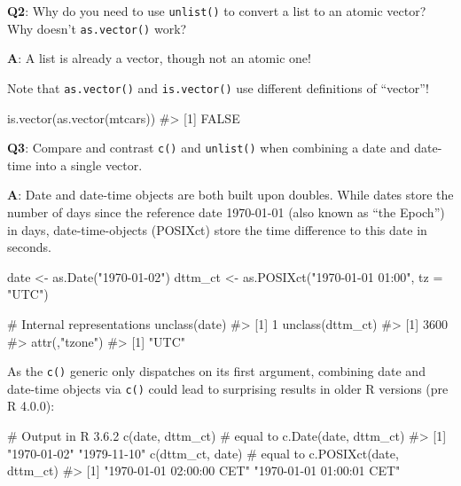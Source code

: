 \documentclass[
]{krantz}
\makeatletter
\newenvironment{Shaded}{\begin{snugshade}}{\end{snugshade}}
\newcommand{\CommentTok}[1]{\textcolor[rgb]{0.56,0.35,0.01}{\textit{#1}}}
\newcommand{\DataTypeTok}[1]{\textcolor[rgb]{0.13,0.29,0.53}{#1}}
\newcommand{\KeywordTok}[1]{\textcolor[rgb]{0.13,0.29,0.53}{\textbf{#1}}}
\newcommand{\NormalTok}[1]{#1}
\newcommand{\StringTok}[1]{\textcolor[rgb]{0.31,0.60,0.02}{#1}}
\newenvironment{kframe}{%
\medskip{}
\setlength{\fboxsep}{.8em}
 \def\at@end@of@kframe{}%
 \ifinner\ifhmode%
  \def\at@end@of@kframe{\end{minipage}}%
  \begin{minipage}{\columnwidth}%
 \fi\fi%
 \def\FrameCommand##1{\hskip\@totalleftmargin \hskip-\fboxsep
 \colorbox{shadecolor}{##1}\hskip-\fboxsep
     \hskip-\linewidth \hskip-\@totalleftmargin \hskip\columnwidth}%
 \MakeFramed {\advance\hsize-\width
   \@totalleftmargin\z@ \linewidth\hsize
   \@setminipage}}%
 {\par\unskip\endMakeFramed%
 \at@end@of@kframe}
\renewenvironment{Shaded}{\begin{kframe}}{\end{kframe}}
\renewcommand{\KeywordTok} [1]{\textcolor[rgb]{0.00,0.44,0.13}{{#1}}}
\renewcommand{\DataTypeTok}[1]{\textcolor[rgb]{0.56,0.13,0.00}{{#1}}}
\renewcommand{\StringTok}  [1]{\textcolor[rgb]{0.25,0.44,0.63}{{#1}}}
\renewcommand{\CommentTok} [1]{\textcolor[rgb]{0.38,0.63,0.69}{{#1}}}
\renewcommand{\NormalTok}  [1]{{#1}}
\makeatother
\begin{document}
\textbf{{Q2}}: Why do you need to use \texttt{unlist()} to convert a list to an atomic vector? Why doesn't \texttt{as.vector()} work?

\textbf{{A}}: A list is already a vector, though not an atomic one!

Note that \texttt{as.vector()} and \texttt{is.vector()} use different definitions of
``vector''!

\begin{Shaded}
\begin{Highlighting}[]
\KeywordTok{is.vector}\NormalTok{(}\KeywordTok{as.vector}\NormalTok{(mtcars))}
\CommentTok{#> [1] FALSE}
\end{Highlighting}
\end{Shaded}

\textbf{{Q3}}: Compare and contrast \texttt{c()} and \texttt{unlist()} when combining a date and date-time into a single vector.

\textbf{{A}}: Date and date-time objects are both built upon doubles. While dates store the number of days since the reference date 1970-01-01 (also known as ``the Epoch'') in days, date-time-objects (POSIXct) store the time difference to this date in seconds.

\begin{Shaded}
\begin{Highlighting}[]
\NormalTok{date    <-}\StringTok{ }\KeywordTok{as.Date}\NormalTok{(}\StringTok{"1970-01-02"}\NormalTok{)}
\NormalTok{dttm_ct <-}\StringTok{ }\KeywordTok{as.POSIXct}\NormalTok{(}\StringTok{"1970-01-01 01:00"}\NormalTok{, }\DataTypeTok{tz =} \StringTok{"UTC"}\NormalTok{)}

\CommentTok{# Internal representations}
\KeywordTok{unclass}\NormalTok{(date)}
\CommentTok{#> [1] 1}
\KeywordTok{unclass}\NormalTok{(dttm_ct)}
\CommentTok{#> [1] 3600}
\CommentTok{#> attr(,"tzone")}
\CommentTok{#> [1] "UTC"}
\end{Highlighting}
\end{Shaded}

As the \texttt{c()} generic only dispatches on its first argument, combining date and date-time objects via \texttt{c()} could lead to surprising results in older R versions (pre R 4.0.0):

\begin{Shaded}
\begin{Highlighting}[]
\CommentTok{# Output in R 3.6.2}
\KeywordTok{c}\NormalTok{(date, dttm_ct)  }\CommentTok{# equal to c.Date(date, dttm_ct) }
\CommentTok{#> [1] "1970-01-02" "1979-11-10"}
\KeywordTok{c}\NormalTok{(dttm_ct, date)  }\CommentTok{# equal to c.POSIXct(date, dttm_ct)}
\CommentTok{#> [1] "1970-01-01 02:00:00 CET" "1970-01-01 01:00:01 CET"}
\end{Highlighting}
\end{Shaded}
\end{document}
